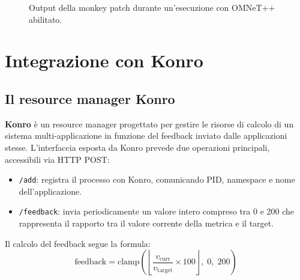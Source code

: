 \documentclass[12pt,a4paper]{article}
\begin{document}
\begin{figure}[H]
  \centering
  \caption{Output della monkey patch durante un'esecuzione con OMNeT++ abilitato.}
  \label{fig:monkey_log}
\end{figure}

\section{Integrazione con Konro}

\subsection{Il resource manager Konro}

\textbf{Konro} \`e un resource manager progettato per gestire le risorse di calcolo di un
sistema multi-applicazione in funzione del feedback inviato dalle applicazioni stesse.
L'interfaccia esposta da Konro prevede due operazioni principali, accessibili via HTTP POST:

\begin{itemize}
  \item \texttt{/add}: registra il processo con Konro, comunicando PID, namespace e nome
        dell'applicazione.
  \item \texttt{/feedback}: invia periodicamente un valore intero compreso tra 0 e 200
        che rappresenta il rapporto tra il valore corrente della metrica e il target.
\end{itemize}

Il calcolo del feedback segue la formula:
\begin{equation}
  \text{feedback} = \text{clamp}\!\left(\left\lfloor\frac{v_\text{curr}}{v_\text{target}} \times 100\right\rfloor,\; 0,\; 200\right)
\end{equation}
\end{document}
